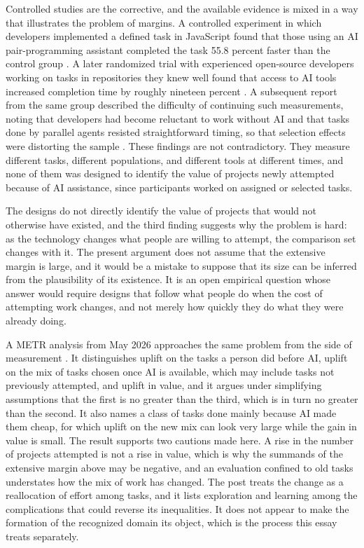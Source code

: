 \documentclass[11pt]{article}
\theoremstyle{remark}
\begin{document}
Controlled studies are the corrective, and the available evidence is mixed in a way that illustrates the problem of margins. A controlled experiment in which developers implemented a defined task in JavaScript found that those using an AI pair-programming assistant completed the task 55.8 percent faster than the control group \cite{peng2023}. A later randomized trial with experienced open-source developers working on tasks in repositories they knew well found that access to AI tools increased completion time by roughly nineteen percent \cite{becker2025}. A subsequent report from the same group described the difficulty of continuing such measurements, noting that developers had become reluctant to work without AI and that tasks done by parallel agents resisted straightforward timing, so that selection effects were distorting the sample \cite{metr2026}. These findings are not contradictory. They measure different tasks, different populations, and different tools at different times, and none of them was designed to identify the value of projects newly attempted because of AI assistance, since participants worked on assigned or selected tasks.

The designs do not directly identify the value of projects that would not otherwise have existed, and the third finding suggests why the problem is hard: as the technology changes what people are willing to attempt, the comparison set changes with it. The present argument does not assume that the extensive margin is large, and it would be a mistake to suppose that its size can be inferred from the plausibility of its existence. It is an open empirical question whose answer would require designs that follow what people do when the cost of attempting work changes, and not merely how quickly they do what they were already doing.

A METR analysis from May 2026 approaches the same problem from the side of measurement \cite{cunningham2026}. It distinguishes uplift on the tasks a person did before AI, uplift on the mix of tasks chosen once AI is available, which may include tasks not previously attempted, and uplift in value, and it argues under simplifying assumptions that the first is no greater than the third, which is in turn no greater than the second. It also names a class of tasks done mainly because AI made them cheap, for which uplift on the new mix can look very large while the gain in value is small. The result supports two cautions made here. A rise in the number of projects attempted is not a rise in value, which is why the summands of the extensive margin above may be negative, and an evaluation confined to old tasks understates how the mix of work has changed. The post treats the change as a reallocation of effort among tasks, and it lists exploration and learning among the complications that could reverse its inequalities. It does not appear to make the formation of the recognized domain its object, which is the process this essay treats separately.
\end{document}
